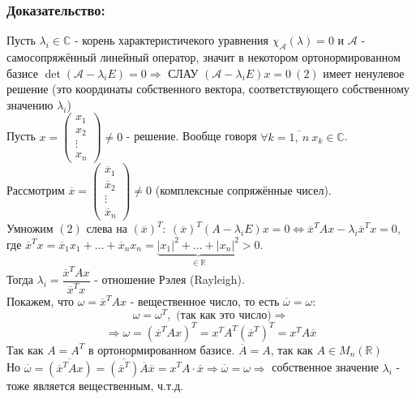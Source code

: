 \documentclass[12pt, letterpaper, twoside]{article}
\newcommand{\mb}[1]{\mathbb{#1}}
\begin{document}
    \subsubsection*{Доказательство:}
    Пусть $\lambda_i\in \mb{C}$ - корень характеристичекого уравнения $\chi_{\mathcal{A}}(\lambda) = 0$ и $\mathcal{A}$ - самосопряжённый линейный оператор, значит в некотором ортонормированном базисе $\det(\mathcal{A} - \lambda_i E) = 0\Rightarrow$ СЛАУ $(\mathcal{A} - \lambda_i E) x = 0\ (2)$ имеет ненулевое решение (это координаты собственного вектора, соответствующего собственному значению $\lambda_i$)\\
    Пусть $x = \begin{pmatrix}
        x_1 \\ x_2\\ \vdots\\ x_n
    \end{pmatrix}\neq 0$ - решение. Вообще говоря $\forall k = \overline{1,\ n}\ x_k \in \mathbb{C}$.\\
    Рассмотрим $\overline{x} = \begin{pmatrix}
        \overline{x}_1 \\ \overline{x}_2\\ \vdots\\ \overline{x}_n
    \end{pmatrix}\neq 0$ (комплексные сопряжённые чисел).\\
    Умножим $(2)$ слева на $(\overline{x})^T:\ (\overline{x})^T(A - \lambda_i E)x = 0 \Leftrightarrow \overline{x}^T A x - \lambda_i \overline{x}^T x = 0$, где $\overline{x}^T x = \overline{x}_1 x_1 + \dots + \overline{x}_n x_n = \underset{\in \mb{R}}{\underbrace{|x_1|^2 + \dots + |x_n|^2}} > 0$.\\
    Тогда $\lambda_i = \dfrac{\overline{x}^T A x}{\overline{x}^T x}$ - отношение Рэлея (Rayleigh).\\
    Покажем, что $\omega = \overline{x}^T A x$ - вещественное число, то есть $\overline{\omega} = \omega$:
    \[\omega = \omega^T,\text{ (так как это число)}\Rightarrow \]
    \[\Rightarrow \omega = (\overline{x}^T A x)^T = x^T A^T (\overline{x}^T)^T = x^T A \overline{x}\] Так как $A = A^T$ в ортонормированном базисе. $\overline{A} = A$, так как $A\in M_n(\mb{R})$\\
    Но $\overline{\omega} = \overline{(\overline{x}^T A x)} = \overline{\left(\overline{x}^T\right)}\overline{A} \overline{x} = x^T A \cdot \overline{x}\Rightarrow \overline{\omega} = \omega\Rightarrow$ собственное значение $\lambda_i$ - тоже является вещественным, ч.т.д.
\end{document}
